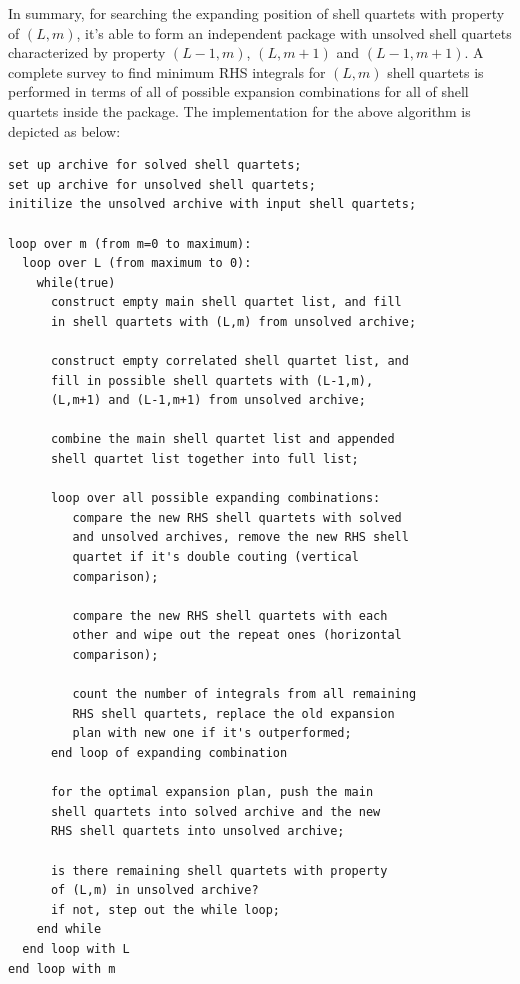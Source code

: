 In summary, for searching the expanding position of shell quartets with property of $(L,m)$, 
it's able to form an independent package with unsolved shell quartets characterized by property 
$(L-1,m)$, $(L,m+1)$ and $(L-1,m+1)$. A complete survey to find minimum RHS integrals for $(L,m)$
shell quartets is performed in terms of all of possible expansion combinations for all of shell 
quartets inside the package. The implementation for the above algorithm is depicted as below:
\begin{verbatim}
set up archive for solved shell quartets;
set up archive for unsolved shell quartets;
initilize the unsolved archive with input shell quartets;

loop over m (from m=0 to maximum):
  loop over L (from maximum to 0):
    while(true)
      construct empty main shell quartet list, and fill 
      in shell quartets with (L,m) from unsolved archive;
    
      construct empty correlated shell quartet list, and 
      fill in possible shell quartets with (L-1,m), 
      (L,m+1) and (L-1,m+1) from unsolved archive;
      
      combine the main shell quartet list and appended
      shell quartet list together into full list;
      
      loop over all possible expanding combinations:
         compare the new RHS shell quartets with solved
         and unsolved archives, remove the new RHS shell
         quartet if it's double couting (vertical 
         comparison);
         
         compare the new RHS shell quartets with each 
         other and wipe out the repeat ones (horizontal
         comparison);
         
         count the number of integrals from all remaining 
         RHS shell quartets, replace the old expansion
         plan with new one if it's outperformed;
      end loop of expanding combination 
       
      for the optimal expansion plan, push the main
      shell quartets into solved archive and the new
      RHS shell quartets into unsolved archive;
       
      is there remaining shell quartets with property
      of (L,m) in unsolved archive?
      if not, step out the while loop;      
    end while
  end loop with L
end loop with m 
\end{verbatim}

